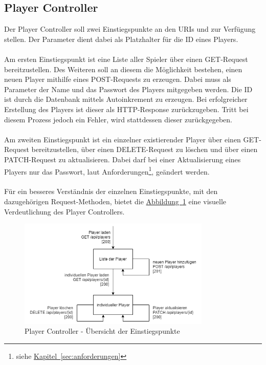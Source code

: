 \subsection{Player Controller}\label{sec:playerController}
Der Player Controller soll zwei Einstiegspunkte an den \glspl{URI}  und  zur Verfügung stellen. Der Parameter  dient dabei als Platzhalter für die ID eines Players.\\
\\
Am ersten Einstiegspunkt ist eine Liste aller Spieler über einen GET-Request bereitzustellen. Des Weiteren soll an diesem die Möglichkeit bestehen, einen neuen Player mithilfe eines POST-Requests zu erzeugen. Dabei muss als Parameter der Name und das Passwort des Players mitgegeben werden. Die ID ist durch die Datenbank mittels Autoinkrement zu erzeugen. Bei erfolgreicher Erstellung des Players ist dieser als \gls{HTTP}-Response zurückzugeben. Tritt bei diesem Prozess jedoch ein Fehler, wird stattdessen dieser zurückgegeben.\\
\\
Am zweiten Einstiegspunkt ist ein einzelner existierender Player über einen GET-Request bereitzustellen, über einen DELETE-Request zu löschen und über einen PATCH-Request zu aktualisieren. Dabei darf bei einer Aktualisierung eines Players nur das Passwort, laut Anforderungen\footnote{siehe \hyperref[sec:anforderungen]{Kapitel~\ref{sec:anforderungen}}}, geändert werden.\\
\\
Für ein besseres Verständnis der einzelnen Einstiegspunkte, mit den dazugehörigen Request-Methoden, bietet die \hyperref[fig:playerController]{Abbildung~\ref{fig:playerController}} eine visuelle Verdeutlichung des Player Controllers.\\
\begin{figure}[htb]
	\includegraphics[width=0.816\textwidth]{images/player-controller.png}
	\caption{Player Controller - Übersicht der Einstiegspunkte}
	\label{fig:playerController}
\end{figure}

